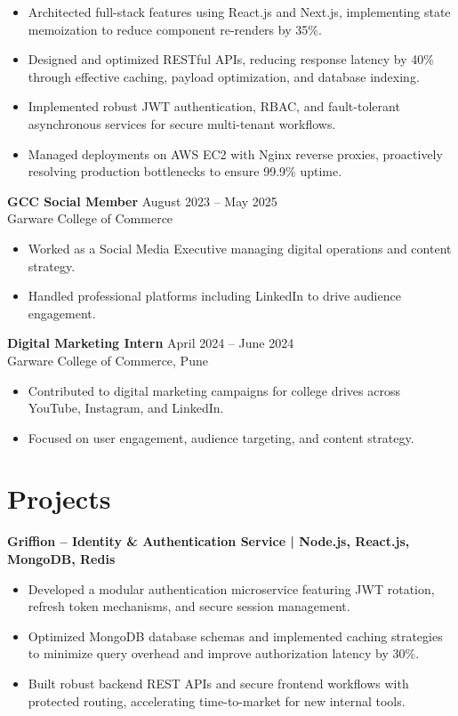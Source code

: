 \documentclass[a4paper,10pt]{article}
\begin{document}
\begin{itemize}[leftmargin=*]
    \item Architected full-stack features using React.js and Next.js, implementing state memoization to reduce component re-renders by 35\%.
    \item Designed and optimized RESTful APIs, reducing response latency by 40\% through effective caching, payload optimization, and database indexing.
    \item Implemented robust JWT authentication, RBAC, and fault-tolerant asynchronous services for secure multi-tenant workflows.
    \item Managed deployments on AWS EC2 with Nginx reverse proxies, proactively resolving production bottlenecks to ensure 99.9\% uptime.
\end{itemize}

\textbf{GCC Social Member} \hfill August 2023 -- May 2025\\
Garware College of Commerce
\begin{itemize}[leftmargin=*]
    \item Worked as a Social Media Executive managing digital operations and content strategy.
    \item Handled professional platforms including LinkedIn to drive audience engagement.
\end{itemize}

\textbf{Digital Marketing Intern} \hfill April 2024 -- June 2024\\
Garware College of Commerce, Pune
\begin{itemize}[leftmargin=*]
    \item Contributed to digital marketing campaigns for college drives across YouTube, Instagram, and LinkedIn.
    \item Focused on user engagement, audience targeting, and content strategy.
\end{itemize}


\section*{Projects}

\textbf{Griffion -- Identity \& Authentication Service | Node.js, React.js, MongoDB, Redis}

\begin{itemize}[leftmargin=*]
    \item Developed a modular authentication microservice featuring JWT rotation, refresh token mechanisms, and secure session management.
    \item Optimized MongoDB database schemas and implemented caching strategies to minimize query overhead and improve authorization latency by 30\%.
    \item Built robust backend REST APIs and secure frontend workflows with protected routing, accelerating time-to-market for new internal tools.
\end{itemize}
\end{document}
